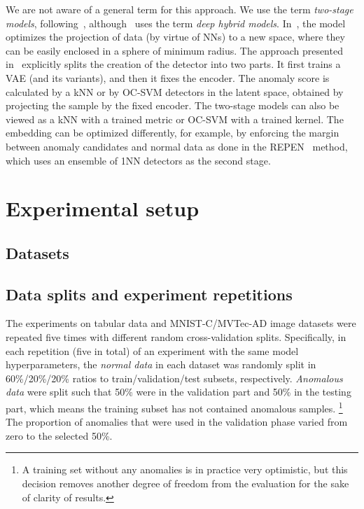 We are not aware of a general term for this approach. We use the term \textit{two-stage models}, following~\cite{dai2019diagnosing}, although~\cite{chalapathy2019deep} uses the term \textit{deep hybrid models}. In~\cite{ruff2018deep}, the model optimizes the projection of data (by virtue of NNs) to a new space, where they can be easily enclosed in a sphere of minimum radius. The approach presented in~\cite{vskvara2020detection, yaoUnsupervisedAnomalyDetection2019} explicitly splits the creation of the detector into two parts. It first trains a VAE (and its variants), and then it fixes the encoder. The anomaly score is calculated by a kNN \cite{vskvara2020detection} or by OC-SVM \cite{yaoUnsupervisedAnomalyDetection2019} detectors in the latent space, obtained by projecting the sample by the fixed encoder. The two-stage models can also be viewed as a kNN with a trained metric or OC-SVM with a trained kernel. The embedding can be optimized differently, for example, by enforcing the margin between anomaly candidates and normal data as done in the REPEN~\cite{pangLearningRepresentationsUltrahighdimensional2018} method, which uses an ensemble of 1NN detectors as the second stage.

\section{Experimental setup}
\label{sec:experimentalsetup}
\subsection{Datasets}

\subsection{Data splits and experiment repetitions}
\label{sec:repetitions}
The experiments on tabular data and MNIST-C/MVTec-AD image datasets were repeated five times with different random cross-validation splits. Specifically, in each repetition (five in total) of an experiment with the same model hyperparameters, the \textit{normal data} in each dataset was randomly split in 60\%/20\%/20\% ratios to train/validation/test subsets, respectively. \textit{Anomalous data} were split such that 50\% were in the validation part and 50\% in the testing part, which means the training subset has not contained anomalous samples. \footnote{A training set without any anomalies is in practice very optimistic, but this decision removes another degree of freedom from the evaluation for the sake of clarity of results.} The proportion of anomalies that were used in the validation phase varied from zero to the selected 50\%. 

